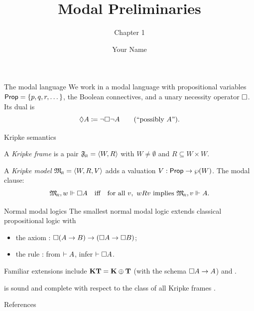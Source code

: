 \documentclass{beamer}
\title{Modal Preliminaries}
\subtitle{Chapter 1}
\author{Your Name}
\institute{Your Department \\ University of California, Davis}
\date{}
\begin{document}
\frame{\titlepage}

\begin{frame}{The modal language}
  We work in a modal language \langm{} with propositional variables
  $\mathsf{Prop} = \{p, q, r, \dots\}$, the Boolean connectives, and a unary
  necessity operator $\Box$.  Its dual is
  \[
    \Diamond A \coloneqq \neg\Box\neg A \qquad (\text{``possibly } A\text{''}).
  \]
\end{frame}

\begin{frame}{Kripke semantics}
  \begin{definition}[Frame]
    A \emph{Kripke frame} is a pair ${\mathfrak{F}_{\!\scriptscriptstyle R}} = \langle W, R \rangle$ with $W \neq \emptyset$
    and $R \subseteq W \times W$.
  \end{definition}
  \begin{definition}[Model]
    A \emph{Kripke model} ${\mathfrak{M}_{\!\scriptscriptstyle R}} = \langle W, R, V \rangle$ adds a valuation
    $V : \mathsf{Prop} \to \wp(W)$.  The modal clause:
    \[
      {\mathfrak{M}_{\!\scriptscriptstyle R}},w \Vdash \Box A
      \quad\text{iff}\quad
      \text{for all } v,\ wRv \text{ implies } {\mathfrak{M}_{\!\scriptscriptstyle R}},v \Vdash A.
    \]
  \end{definition}
\end{frame}

\begin{frame}{Normal modal logics}
  The smallest normal modal logic \K{} extends classical propositional logic
  with
  \begin{itemize}
    \item the axiom \kax: $\Box(A \to B) \to (\Box A \to \Box B)$;
    \item the rule \nrule: from $\vdash A$, infer $\vdash \Box A$.
  \end{itemize}
  Familiar extensions include $\textup{\textbf{KT}} = \textup{\textbf{K}} \oplus \textbf{T}$ (with \tax{} the schema
  $\Box A \to A$) and \Sfour.

  \begin{theorem}[Completeness]
    \K{} is sound and complete with respect to the class of all Kripke frames
    \parencite[ch.~4]{blackburn2001}.
  \end{theorem}
\end{frame}

\begin{frame}[allowframebreaks]{References}
  \printbibliography
\end{frame}
\end{document}
